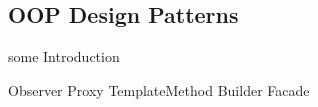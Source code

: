 \subsection{OOP Design Patterns}

some Introduction

{Observer}
{Proxy}
{TemplateMethod}
{Builder}
{Facade}




